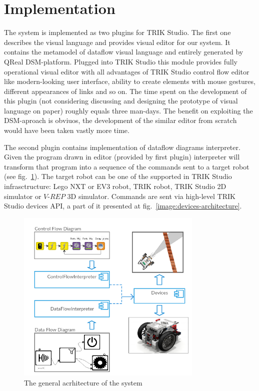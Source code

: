 \documentclass[conference,compsoc]{IEEEtran}
\begin{document}
\section{Implementation}
\label{sec:Implementation}
The system is implemented as two plugins for TRIK Studio. The first one describes the visual language and provides visual editor for our system. It contains the metamodel of dataflow visual language and entirely generated by QReal DSM-platform. Plugged into TRIK Studio this module provides fully operational visual editor with all advantages of TRIK Studio control flow editor like modern-looking user interface, ability to create elements with mouse gestures, different appearances of links and so on. The time spent on the development of this plugin (not considering discussing and designing the prototype of visual language on paper) roughly equals three man-days. The benefit on exploiting the DSM-aproach is obviuos, the development of the similar editor from scratch would have been taken vastly more time.

The second plugin contains implementation of dataflow diagrams interpreter. Given the program drawn in editor (provided by first plugin) interpreter will transform that program into a sequence of the commands sent to a target robot (see fig.~\ref{image:common-architecture}). The target robot can be one of the supported in TRIK Studio infrasctructure: Lego NXT or EV3 robot, TRIK robot, TRIK Studio 2D simulator or $V\mbox{-}REP$ 3D simulator\cite{rohmer2013v}. Commands are sent via high-level TRIK Studio devices API, a part of it presented at fig.~\ref{image:devices-architecture}.

\begin{figure}[ht]
	\centering
	\includegraphics[width=3.5in]{Common.png}
	\caption{The general acrhitecture of the system}
	\label{image:common-architecture}
\end{figure}
\end{document}
